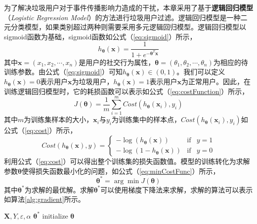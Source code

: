 为了解决垃圾用户对于事件传播影响力造成的干扰，本章采用了基于\textbf{逻辑回归模型}（\textit{Logistic Regression Model}）的方法进行垃圾用户过滤。逻辑回归模型是一种二元分类模型，如果类别超过两种则需要采用多元逻辑回归模型。逻辑回归模型以sigmoid函数为基础，sigmoid函数如公式（\ref{eq:sigmoid}）所示，
\begin{equation}
\label{eq:sigmoid}
	h_ {\bm{\theta}} \left(\mathbf{x}\right) = \frac{1}{1 + e^{-{{\bm{\theta}}^T}\mathbf{x}}}
\end{equation}
其中$\mathbf{x}=\left({x_1},{x_2},\cdots,{x_n}\right)$是用户的社交行为属性，$\bm{\theta}=\left({\theta _1},{\theta _2},\cdots,{\theta _n}\right)$为相应的待训练参数。由公式（\ref{eq:sigmoid}）可知$h_ {\bm{\theta}} \left(\mathbf{x}\right) \in \left(0,1\right)$。我们可以定义$h_ {\bm{\theta}} \left(\mathbf{x}\right) = 0$表示用户$\mathbf{x}$为垃圾用户，$h_ {\bm{\theta}} \left(\mathbf{x}\right) = 1$表示用户$\mathbf{x}$为正常用户。因此，在训练逻辑回归模型时，它的耗损函数可以表示如公式（\ref{eq:costFunction}）所示，
\begin{equation}
\label{eq:costFunction}
	J\left(\bm{\theta}\right) = \frac{1}{m}\sum_{i=1}^m {Cost\left( h_ {\bm{\theta}}\left(\mathbf{x}_i\right), y_i\right)}
\end{equation}
其中$m$为训练集样本的大小，$\mathbf{x}_i$与$y_i$为训练集中的样本点，$Cost\left( h_ {\bm{\theta}}\left(\mathbf{x}_i\right), y_i\right)$如公式（\ref{eq:cost}）所示，
\begin{equation}
\label{eq:cost}
	Cost\left( h_ {\bm{\theta}}\left(\mathbf{x}\right), y\right) = \left\{ \begin{array}{rcl} -\log \left(h_ {\bm{\theta}} \left(\mathbf{x}\right)\right) & \mbox{if} & y=1 \\ -\log \left(1 - h_ {\bm{\theta}} \left(\mathbf{x}\right) \right) & \mbox{if} & y=0  \end{array} \right.
\end{equation}
利用公式（\ref{eq:cost}）可以得出整个训练集的损失函数值。模型的训练转化为求解参数$\bm{\theta}$使得损失函数最小化的问题，如公式（\ref{eq:minCostFunc}）所示，
\begin{equation}
\label{eq:minCostFunc}
	\bm{\theta}^{\ast} = \arg\min{J\left(\bm{\theta}\right)}
\end{equation}
其中$\bm{\theta}^{\ast}$为求解的最优解。求解$\bm{\theta}^{\ast}$可以使用梯度下降法来求解，求解的算法可以表示如算法\ref{alg:gradient}所示。
\begin{algorithm}[!ht]
	\caption{$Gradient(\mathbf{X},Y)$}
	\label{alg:gradient}
	\begin{algorithmic}[1]
	\REQUIRE $\mathbf{X},Y,\varepsilon,\alpha$
	\ENSURE $\bm{\theta}^{\ast}$
	\STATE initialize $\bm{\theta}$
	\ENDWHILE
    \end{algorithmic}
\end{algorithm}

